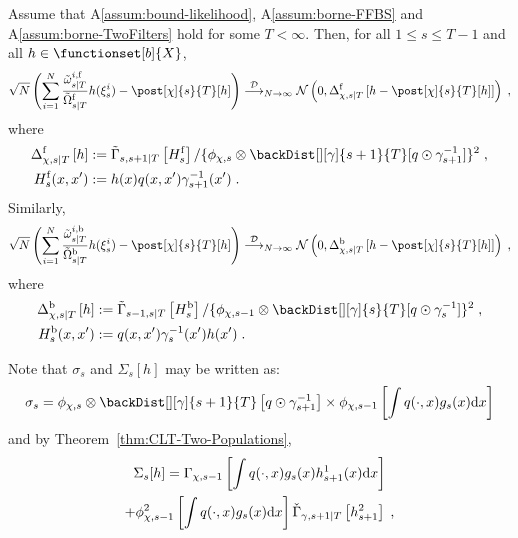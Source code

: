 \begin{thm}
\label{thm:CLT-Doucet-Forward-Backward-Smoother}
Assume that A\ref{assum:bound-likelihood}, A\ref{assum:borne-FFBS} and A\ref{assum:borne-TwoFilters} hold for some $T<\infty$. Then, for all $1 \leq s \leq T-1$ and all $h \in \functionset[b]{X}$,
\begin{equation*}
\sqrt{N}\left( \sum_{i=1}^N \frac{\smwght{s}{T}{i, \mathrm{f}}}{\tilde{\Omega}^{\mathrm{f}}_{s|T}} h(\epart{s}{i}) - \post[\Xinit]{s}{T}[h]
\right) \dlim_{N \to \infty} \mathcal{N}\left(0,\asymVarDoucet[\Xinit]{\forward}{s}{T}{h- \post[\Xinit]{s}{T}[h]} \right)\eqsp,
\end{equation*}
where
\begin{align*}
\asymVarDoucet[\Xinit]{\forward}{s}{T}{h} &\eqdef \asymVarJoint{s,s+1}{T}{H^{\forward}_s} /\{ \filt{\Xinit,s} \otimes \backDist[][\gamma]{s+1}{T}[q \odot \fakeprior_{s+1}^{-1}] \}^2\eqsp,\\
H^{\forward}_s (x,x') &\eqdef h(x) q(x,x') \fakeprior_{s+1}^{-1}(x')\eqsp.
\end{align*}
Similarly,
\begin{equation*}
\sqrt{N}\left( \sum_{i=1}^N \frac{\smwght{s}{T}{i, \mathrm{b}}}{\tilde{\Omega}^{\mathrm{b}}_{s|T}} h(\epart{s}{i}) - \post[\Xinit]{s}{T}[h]
\right)
\dlim_{N \to \infty} \mathcal{N}\left(0, \asymVarDoucet[\Xinit]{\backward}{s}{T}{h- \post[\Xinit]{s}{T}[h]}\right)\eqsp,
\end{equation*}
where
\begin{align*}
\asymVarDoucet[\Xinit]{\backward}{s}{T}{h} &\eqdef \asymVarJoint{s-1,s}{T}{H_s^{\backward} }/\{ \filt{\Xinit,s-1} \otimes \backDist[][\gamma]{s}{T}[q \odot \fakeprior_s^{-1}] \}^2\eqsp,\\
H_s^{\backward} (x,x') &\eqdef  q(x,x') \fakeprior_s^{-1}(x')h(x')\eqsp.
\end{align*}
\end{thm}
Note that $\sigma_s$ and $\Sigma_s[h]$ may be written as:
\[
\sigma_s = \filt{\Xinit,s} \otimes \backDist[][\gamma]{s+1}{T} \left[q\odot \fakeprior_{s+1}^{-1} \right]\times \filt{\Xinit,s-1}\left[ \int  q(\cdot,x) g_s(x) \rmd x\right]
\]
and by Theorem~\ref{thm:CLT-Two-Populations},
\begin{multline*}
\Sigma_s[h] = \asymVar[\Xinit]{s-1}{\int q(\cdot,x)g_s(x)h^1_{s+1}(x)\rmd x} \\
+ \filt{\Xinit,s-1}^2\left[ \int  q(\cdot,x) g_s(x) \rmd x\right]\backasymVar[\gamma]{s+1}{T}{h^2_{s+1}}\eqsp,
\end{multline*}
